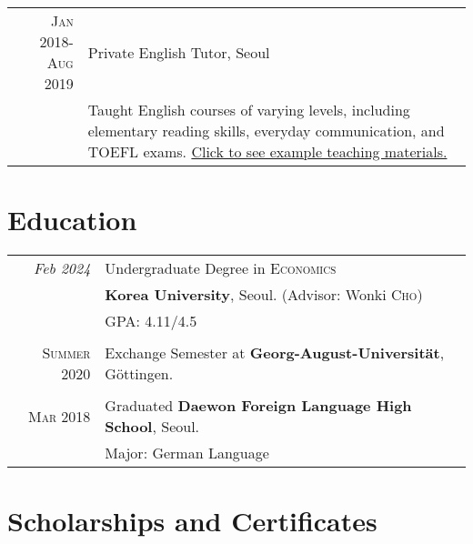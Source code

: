 \documentclass[a4paper,10pt]{article} %
\begin{document}
\begin{tabular}{r|p{11cm}}
    \textsc{Jan 2018-Aug 2019} & Private English Tutor, Seoul \emph{}\\
    & \footnotesize{Taught English courses of varying
        levels, including elementary reading skills,
        everyday communication, and TOEFL exams. \href{https://drive.google.com/file/d/1uuF_h_x29hSJ3l61F7Kzxi_kKohBBTpJ/view?usp=sharing}{Click
        to see example teaching materials.}}\\

\end{tabular}


\section{Education}

\begin{tabular}{rl}
    \emph{Feb 2024} & Undergraduate Degree in \textsc{}\textsc{Economics}
    \\& \normalsize\textbf{Korea University}, Seoul.
    \small (Advisor: Wonki \textsc{Cho})\\
    &\normalsize \textsc{GPA}: 4.11/4.5 \\
    &\\

    \textsc{Summer} 2020 & Exchange Semester at \textbf{Georg-August-Universität},
    Göttingen.\\
    &\\

    \textsc{Mar} 2018& Graduated \textbf{Daewon
    Foreign Language High School}, Seoul.\\
    &Major: German Language\\
\end{tabular}


\section{Scholarships and Certificates}
\end{document}
